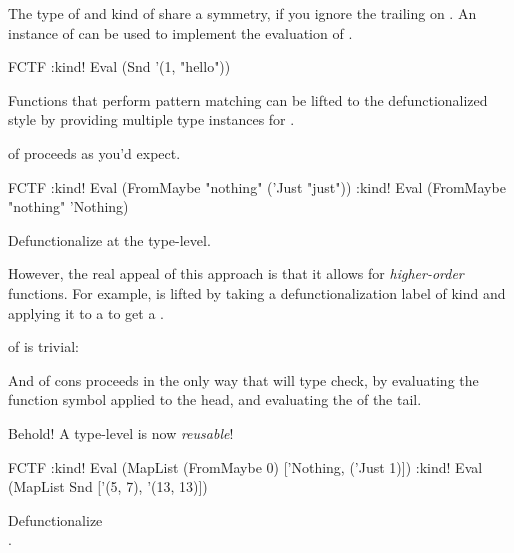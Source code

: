 \documentclass[book.tex]{subfiles}
\begin{document}
The type of  and kind of  share a symmetry, if you ignore the
trailing  on . An instance of  can be used to
implement the evaluation of .


\begin{dorepl}{FCTF}
:kind! Eval (Snd '(1, "hello"))
\end{dorepl}

Functions that perform pattern matching can be lifted to the defunctionalized
style by providing multiple type instances for .


 of  proceeds as you'd expect.

\begin{dorepl}{FCTF}
:kind! Eval (FromMaybe "nothing" ('Just "just"))
:kind! Eval (FromMaybe "nothing" 'Nothing)
\end{dorepl}

\begin{exercise}
Defunctionalize  at the type-level.
\end{exercise}
\begin{solution}
\end{solution}

However, the real appeal of this approach is that it allows for
\emph{higher-order} functions. For example,  is lifted by taking a
defunctionalization label of kind  and applying it to a
\kind{[a]} to get a .


 of  is trivial:


And  of cons proceeds in the only way that will type check, by
evaluating the function symbol applied to the head, and evaluating the
 of the tail.


Behold! A type-level  is now \emph{reusable}!

\begin{dorepl}{FCTF}
:kind! Eval (MapList (FromMaybe 0) ['Nothing, ('Just 1)])
:kind! Eval (MapList Snd ['(5, 7), '(13, 13)])
\end{dorepl}

\begin{exercise}
Defunctionalize  \\ .
\end{exercise}
\begin{solution}
\end{solution}
\end{document}
